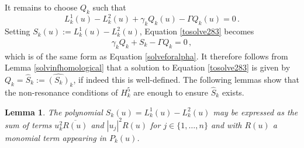 \documentclass[12pt]{article}
\theoremstyle{plain}
\newtheorem{lem}[thr]{Lemma}
\theoremstyle{definition}
\theoremstyle{remark}
\theoremstyle{remark}
\begin{document}
It remains to choose $Q_k$ such that
\begin{equation}\label{tosolve283}
L^1_k(u) - L^2_k(u)+ \gamma_kQ_k(u) - \Gamma Q_k(u) = 0\, .
\end{equation}
Setting $S_k(u) := L^1_k(u) - L^2_k(u)$, Equation \eqref{tosolve283} becomes 
\begin{align}\label{solveforalpha2}
\gamma_kQ_k + S_k - \Gamma Q_k = 0\, ,
\end{align}
which is of the same form as Equation \eqref{solveforalpha}. It therefore follows from Lemma \eqref{solvinfhomological} that a solution to Equation \eqref{tosolve283} is given by $Q_k = \widehat{S}_k := \widehat{(S_k)}_k$, if indeed this is well-defined.
The following lemmas show that the non-resonance conditions of $H_k^5$ are enough to ensure $\widehat{S}_k$ exists.  

\begin{lem}\label{lemnonreso1}
The polynomial $S_k(u) = L^1_k(u) - L^2_k(u)$ may be expressed as the sum of terms $u_k^2\overline{R(u)}$ and  $|u_j|^2R(u)$ for  $j \in \{1, \dots, n\}$ and with $R(u)$ a monomial term appearing in $P_k(u)$.
\end{lem}
\end{document}
